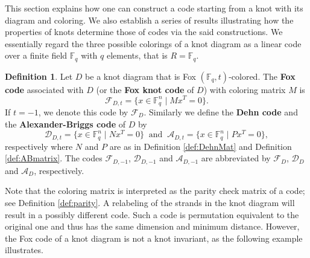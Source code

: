\documentclass[11pt,a4paper]{article}
\theoremstyle{definition}
\newtheorem{definition}[theorem]{Definition}
\newcommand{\numberset}{\mathbb}
\newcommand{\F}{\numberset{F}}
\newcommand{\mA}{\mathcal{A}}
\newcommand{\mD}{\mathcal{D}}
\newcommand{\mF}{\mathcal{F}}
\begin{document}
This section explains how 
one can construct a code
starting from 
a knot with its diagram and coloring. 
We also establish a series of results illustrating how the properties of knots determine those of codes via the said constructions.
We essentially regard
the three possible colorings of a knot diagram as a linear code over a finite field $\F_q$ with $q$ elements, that is $R = \F_q$. 
\begin{definition}
\label{def:knotcode}
Let $D$ be a knot diagram that is Fox $(\F_q,t)$-colored.
The \textbf{Fox code} associated with $D$ (or the \textbf{Fox knot code} of $D$) with  coloring matrix $M$ is 
$$
\mF_{D,t} = \{x \in \F_q^n \mid Mx^T = 0 \}.
$$
If $t=-1$, we denote this code by $\mF_{D}$. 
Similarly we define the \textbf{Dehn code}  and the \textbf{Alexander-Briggs code} of $D$ by
$$
\mD_{D,t} = \{x \in \F_q^n \mid Nx^T = 0 \} \ \mbox{ and } \ \mA_{D,t} = \{x \in \F_q^n \mid Px^T = 0 \}, 
$$
respectively where $N$ and $P$ are as in Definition \ref{def:DehnMat} and Definition \ref{def:ABmatrix}. The codes $\mF_{D,-1}$, $\mD_{D,-1}$ and $\mA_{D,-1}$ are abbreviated by $\mF_{D}$, $\mD_{D}$ and $\mA_{D}$, respectively.
\end{definition}

Note that the coloring matrix is interpreted as the parity check matrix of a code; see Definition \ref{def:parity}. 
A relabeling of the strands in the knot diagram will result in a possibly different code. 
Such a code is permutation equivalent to the original one 
and thus has the same dimension and minimum distance.
However, the Fox code of a knot diagram is not a knot invariant, as the following example illustrates.
\end{document}
